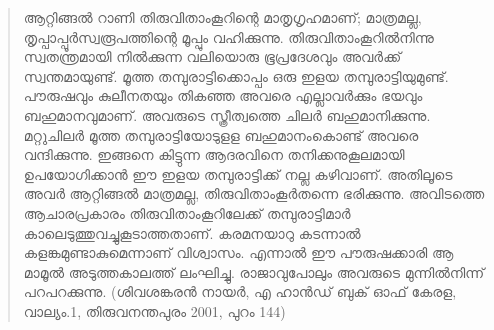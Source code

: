 \begin{quote}
ആറ്റിങ്ങൽ റാണി തിരുവിതാംകൂറിന്റെ മാതൃഗൃഹമാണ്; മാത്രമല്ല, തൃപ്പാപ്പൂർസ്വരൂപത്തിന്റെ മൂപ്പും വഹിക്കുന്നു. തിരുവിതാംകൂറിൽനിന്നു സ്വതന്ത്രമായി നിൽക്കുന്ന വലിയൊരു ഭൂപ്രദേശവും അവർക്ക് സ്വന്തമായുണ്ട്. മൂത്ത തമ്പുരാട്ടിക്കൊപ്പം ഒരു ഇളയ തമ്പുരാട്ടിയുമുണ്ട്. പൗരുഷവും കുലീനതയും തികഞ്ഞ അവരെ എല്ലാവർക്കും ഭയവും ബഹുമാനവുമാണ്. അവരുടെ സ്ത്രീത്വത്തെ ചിലർ ബഹുമാനിക്കുന്നു. മറ്റുചിലർ മൂത്ത തമ്പുരാട്ടിയോടുളള ബഹുമാനംകൊണ്ട് അവരെ വന്ദിക്കുന്നു. ഇങ്ങനെ കിട്ടുന്ന ആദരവിനെ തനിക്കനുകൂലമായി ഉപയോഗിക്കാൻ ഈ ഇളയ തമ്പുരാട്ടിക്ക് നല്ല കഴിവാണ്. അതിലൂടെ അവർ ആറ്റിങ്ങൽ മാത്രമല്ല, തിരുവിതാംകൂർതന്നെ ഭരിക്കുന്നു. അവിടത്തെ ആചാരപ്രകാരം തിരുവിതാംകൂറിലേക്ക് തമ്പുരാട്ടിമാർ കാലെടുത്തുവച്ചുകൂടാത്തതാണ്. കരമനയാറു കടന്നാൽ കളങ്കമുണ്ടാകുമെന്നാണ് വിശ്വാസം. എന്നാൽ ഈ പൗരുഷക്കാരി ആ മാമൂൽ അടുത്തകാലത്ത് ലംഘിച്ചു. രാജാവുപോലും അവരുടെ മുന്നിൽനിന്ന് പറപറക്കുന്നു.
(ശിവശങ്കരൻ നായർ, എ ഹാൻഡ് ബുക് ഓഫ് കേരള, വാല്യം.1, തിരുവനന്തപുരം 2001, പുറം 144)
\end{quote}



